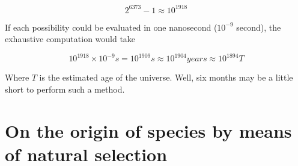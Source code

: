 \documentclass{report}
\begin{document}
	\begin{equation}
	2^{6373} - 1 \approx 10^{1918}
	\end{equation}
	
	If each possibility could be evaluated in one nanosecond ($10^{-9}$ second), the exhaustive computation would take 
	
	\begin{equation}
	10^{1918} \times 10^{-9} s = 10^{1909} s \approx 10^{1904} years \approx 10^{1894} T
	\end{equation}
	
	Where $T$ is the estimated age of the universe. Well, six months may be a little short to perform such a method.
	
	\section{On the origin of species by means of natural selection}
	
\end{document}
